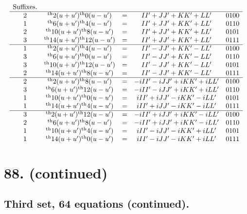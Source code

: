 \documentclass[11pt,a4paper]{book}
\providecommand{\uth}{\textsuperscript{th}}
\begin{document}
\[
\begin{array}{ccccc}
\text{Suffixes.} & & & & \\
\hline
2 & \uth{2}(u+u')\uth{0}(u-u') &=& II' + JJ' + KK' + LL' & 0100 \\
1 & \uth{6}(u+u')\uth{4}(u-u') &=& II' + JJ' + KK' + LL' & 0110 \\
2 & \uth{10}(u+u')\uth{8}(u-u') &=& II' + JJ' + KK' + LL' & 0101 \\
3 & \uth{14}(u+u')\uth{12}(u-u') &=& II' + JJ' + KK' + LL' & 0111 \\
\hline
1 & \uth{2}(u+u')\uth{4}(u-u') &=& II' - JJ' + KK' - LL' & 0100 \\
3 & \uth{6}(u+u')\uth{0}(u-u') &=& II' - JJ' + KK' - LL' & 0110 \\
3 & \uth{10}(u+u')\uth{12}(u-u') &=& II' - JJ' + KK' - LL' & 0101 \\
2 & \uth{14}(u+u')\uth{8}(u-u') &=& II' - JJ' + KK' - LL' & 0111 \\
\hline
2 & \uth{2}(u+u')\uth{8}(u-u') &=& -iII' - iJJ' + iKK' + iLL' & 0100 \\
3 & \uth{6}(u+u')\uth{12}(u-u') &=& -iII' - iJJ' + iKK' + iLL' & 0110 \\
1 & \uth{10}(u+u')\uth{0}(u-u') &=& iII' + iJJ' - iKK' - iLL' & 0101 \\
1 & \uth{14}(u+u')\uth{4}(u-u') &=& iII' + iJJ' - iKK' - iLL' & 0111 \\
\hline
3 & \uth{2}(u+u')\uth{12}(u-u') &=& -iII' + iJJ' + iKK' - iLL' & 0100 \\
2 & \uth{6}(u+u')\uth{8}(u-u') &=& -iII' + iJJ' + iKK' - iLL' & 0110 \\
1 & \uth{10}(u+u')\uth{4}(u-u') &=& iII' - iJJ' - iKK' + iLL' & 0101 \\
1 & \uth{14}(u+u')\uth{0}(u-u') &=& iII' - iJJ' - iKK' + iLL' & 0111
\end{array}
\]


\newpage
\section*{88. (continued)}
\label{sec:88cont}

\subsection*{Third set, 64 equations (continued).}
\end{document}
